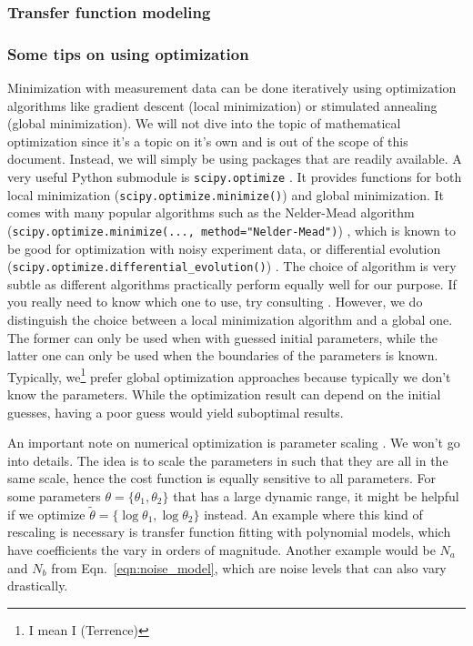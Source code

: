 \subsubsection{Transfer function modeling \label{sec:transfer_function_modeling}}

\subsubsection{Some tips on using optimization \label{sec:optimization_tips}}
Minimization with measurement data can be done iteratively using optimization algorithms like gradient descent \cite{enwiki:1019572955} (local minimization) or stimulated annealing \cite{enwiki:1017509035} (global minimization).
We will not dive into the topic of mathematical optimization since it's a topic on it's own and is out of the scope of this document.
Instead, we will simply be using packages that are readily available.
A very useful Python submodule is \verb|scipy.optimize| \cite{scipy_optimize}.
It provides functions for both local minimization (\verb|scipy.optimize.minimize()|) and global minimization.
It comes with many popular algorithms such as the Nelder-Mead algorithm (\verb|scipy.optimize.minimize(..., method="Nelder-Mead")|) \cite{wiki:nelder_mead}, which is known to be good for optimization with noisy experiment data, or differential evolution \linebreak(\verb|scipy.optimize.differential_evolution()|) \cite{wiki:differential_evolution}.
The choice of algorithm is very subtle as different algorithms practically perform equally well for our purpose.
If you really need to know which one to use, try consulting \cite{scipy_mathematical_optimization}.
However, we do distinguish the choice between a local minimization algorithm and a global one.
The former can only be used when with guessed initial parameters, while the latter one can only be used when the boundaries of the parameters is known.
Typically, we\footnote{I mean I (Terrence)} prefer global optimization approaches because typically we don't know the parameters.
While the optimization result can depend on the initial guesses, having a poor guess would yield suboptimal results.

An important note on numerical optimization is parameter scaling \cite{wiki:preconditioner}.
We won't go into details.
The idea is to scale the parameters in such that they are all in the same scale, hence the cost function is equally sensitive to all parameters.
For some parameters $\theta=\{\theta_1,\theta_2\}$ that has a large dynamic range, it might be helpful if we optimize $\tilde{\theta}=\{\log\theta_1, \log\theta_2\}$ instead.
An example where this kind of rescaling is necessary is transfer function fitting with polynomial models, which have coefficients the vary in orders of magnitude.
Another example would be $N_a$ and $N_b$ from Eqn.~\eqref{eqn:noise_model}, which are noise levels that can also vary drastically.

